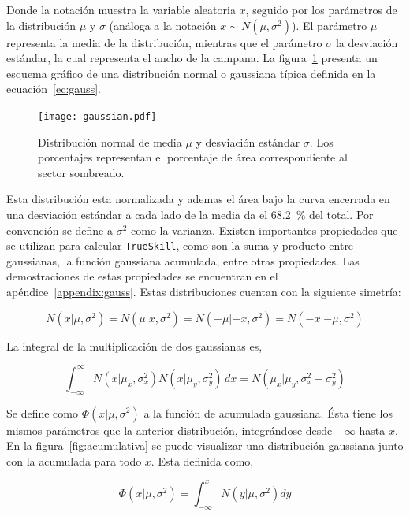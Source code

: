 \documentclass[11pt,twoside,spanish]{report} %
\begin{document}
Donde la notaci\'on muestra la variable aleatoria $x$, seguido por los par\'ametros de la distribuci\'on $\mu$ y $\sigma$ (an\'aloga a la notaci\'on $x \sim N(\mu, \sigma^2)$).
El par\'ametro $\mu$ representa la media de la distribuci\'on, mientras que el par\'ametro $\sigma$ la desviaci\'on est\'andar, la cual representa el ancho de la campana.
La figura~\ref{fig:gaus} presenta un esquema gr\'afico de una distribuci\'on normal o gaussiana t\'ipica definida en la ecuaci\'on~\ref{ec:gauss}.

\begin{figure}[H]
	\centering
	\texttt{[image: gaussian.pdf]}
	\caption{Distribuci\'on normal de media $\mu$ y desviaci\'on est\'andar $\sigma$. Los porcentajes representan el porcentaje de \'area correspondiente al sector sombreado.}
	\label{fig:gaus}
\end{figure}


Esta distribuci\'on esta normalizada y ademas el \'area bajo la curva encerrada en una desviaci\'on est\'andar a cada lado de la media da el \SI{68.2}{\percent} del total.
Por convenci\'on se define a $\sigma^2$ como la varianza.
Existen importantes propiedades que se utilizan para calcular \texttt{TrueSkill}, como son la suma y producto entre gaussianas, la funci\'on gaussiana acumulada, entre otras propiedades.
Las demostraciones de estas propiedades se encuentran en el ap\'endice~\ref{appendix:gauss}.%
Estas distribuciones cuentan con la siguiente simetr\'ia:


\begin{equation}\label{eq:simetria}
N(x|\mu,\sigma^2) = N(\mu|x,\sigma^2) = N(-\mu|-x,\sigma^2) = N(-x|-\mu,\sigma^2)
\end{equation}

La integral de la multiplicaci\'on de dos gaussianas es,

\begin{equation}\label{eq:multiplicacion_normales}
\int_{-\infty}^{\infty} N(x|\mu_x,\sigma_x^2)N(x|\mu_y,\sigma_y^2) \, dx = N(\mu_x|\mu_y,\sigma_x^2+\sigma_y^2)
\end{equation}

Se define como $\Phi(x|\mu,\sigma^2)$ a la funci\'on de acumulada gaussiana.
\'Esta tiene los mismos par\'ametros que la anterior distribuci\'on, integr\'andose desde $-\infty$ hasta $x$.
En la figura~\ref{fig:acumulativa} se puede visualizar una distribuci\'on gaussiana junto con la acumulada para todo $x$.
Esta definida como,


\begin{equation}\label{eq:phi_norm}
 \Phi(x|\mu,\sigma^2) = \int_{-\infty}^{x}N(y|\mu,\sigma^2)dy
\end{equation}
\end{document}
